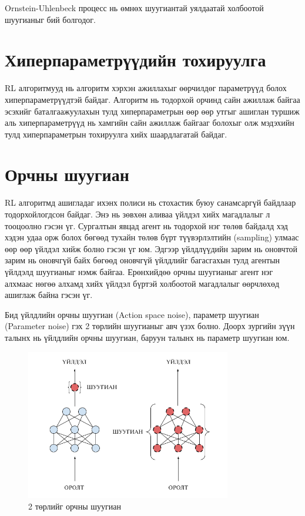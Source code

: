 \documentclass[12pt,A4]{report}
\begin{document}
Ornstein-Uhlenbeck процесс нь өмнөх шуугиантай уялдаатай холбоотой шуугианыг бий болгодог.

\section{Хиперпараметрүүдийн тохируулга}

RL алгоритмууд нь алгоритм хэрхэн ажиллахыг өөрчилдөг параметрүүд болох хиперпараметрүүдтэй байдаг. Алгоритм нь тодорхой орчинд сайн ажиллаж байгаа эсэхийг баталгаажуулахын тулд хиперпараметрын өөр өөр утгыг ашиглан туршиж аль хиперпараметрүүд нь хамгийн сайн ажиллаж байгааг болохыг олж мэдэхийн тулд хиперпараметрын тохируулга хийх шаардлагатай байдаг.

\section{Орчны шуугиан}

RL алгоритмд ашигладаг ихэнх полиси нь стохастик буюу санамсаргүй байдлаар тодорхойлогдсон байдаг. Энэ нь зөвхөн аливаа үйлдэл хийх магадлалыг л тооцоолно гэсэн үг. Сургалтын явцад агент нь тодорхой нэг төлөв байдалд хэд хэдэн удаа орж болох бөгөөд тухайн төлөв бүрт түүвэрлэлтийн (sampling) улмаас өөр өөр үйлдэл хийж болно гэсэн үг юм. Эдгээр үйлдлүүдийн зарим нь оновчтой зарим нь оновчгүй байх бөгөөд оновчгүй үйлдлийг багасгахын тулд агентын үйлдэлд шуугианыг нэмж байгаа. Ерөнхийдөө орчны шуугианыг агент нэг алхмаас нөгөө алхамд хийх үйлдэл бүртэй холбоотой магадлалыг өөрчлөхөд ашиглаж байна гэсэн үг.

Бид үйлдлийн орчны шуугиан (Action space noise), параметр шуугиан (Parameter noise) гэх 2 төрлийн шуугианыг авч үзэх болно. Доорх зургийн зүүн талынх нь үйлдлийн орчны шуугиан, баруун талынх нь параметр шуугиан юм.

\begin{figure}[H]
\centering
\includegraphics[width=0.8\textwidth]{./images/p_diag_1}
\caption{2 төрлийг орчны шуугиан}
\end{figure}
\end{document}
